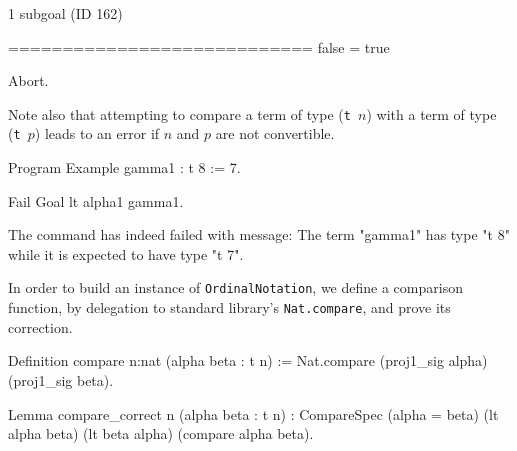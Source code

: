 \begin{Coqanswer}
1 subgoal (ID 162)
  
  ============================
  false = true
\end{Coqanswer}

\begin{Coqsrc}
Abort.
\end{Coqsrc}

Note also that attempting to compare a term  of type (\texttt{t $n$}) with a term of
type (\texttt{t $p$})  leads to an error if $n$ and $p$ are not convertible.

\begin{Coqsrc}

Program Example gamma1 : t 8 := 7.

Fail Goal lt alpha1 gamma1.
\end{Coqsrc}

\begin{Coqanswer}
 The command has indeed failed with message:
The term "gamma1" has type "t 8" while it is expected to have type "t 7".
\end{Coqanswer}


In order to build an instance of \texttt{OrdinalNotation}, we define a comparison function, by delegation to standard library's  \texttt{Nat.compare}, and prove its correction.

\begin{Coqsrc}
Definition compare {n:nat} (alpha beta : t n) :=
  Nat.compare (proj1_sig alpha) (proj1_sig beta).

Lemma compare_correct {n} (alpha beta : t n) :
  CompareSpec (alpha = beta) (lt alpha beta) (lt beta alpha)
              (compare alpha beta).
\end{Coqsrc}

